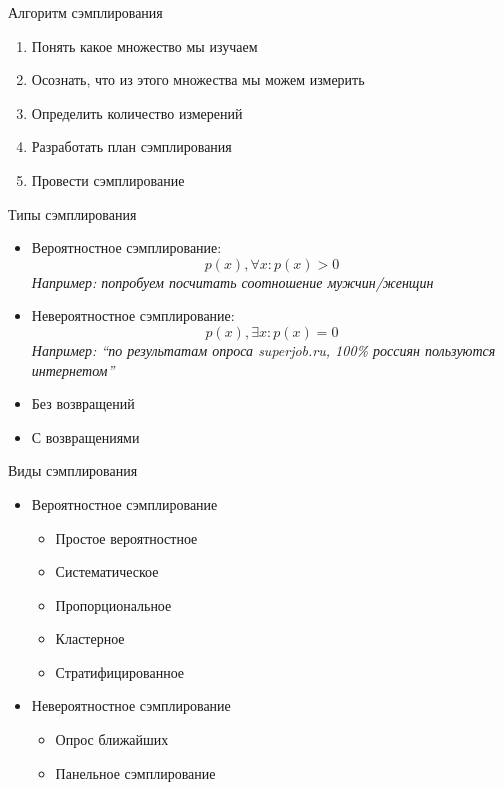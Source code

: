 \documentclass[14pt, fleqn, xcolor={dvipsnames, table}]{beamer}
\begin{document}
\begin{frame}{Алгоритм сэмплирования}
\begin{enumerate}
   \item Понять какое множество мы изучаем
   \item Осознать, что из этого множества мы можем измерить
   \item Определить количество измерений
   \item Разработать план сэмплирования
   \item Провести сэмплирование
\end{enumerate}
\end{frame}

\begin{frame}{Типы сэмплирования}
\begin{itemize}
   \item Вероятностное сэмплирование: 
   $$
   p(x),\forall x:p(x) > 0
   $$
   \textit{Например: попробуем посчитать соотношение мужчин/женщин}
   \item Невероятностное сэмплирование:
   $$
   p(x), \exists x: p(x) = 0
   $$
   \textit{Например: ``по результатам опроса superjob.ru, 100\% россиян пользуются интернетом''}
   \item Без возвращений
   \item С возвращениями
\end{itemize}
\end{frame}

\begin{frame}{Виды сэмплирования}
\begin{itemize}
   \item Вероятностное сэмплирование
   \begin{itemize}
    \item Простое вероятностное
    \item Систематическое
    \item Пропорциональное
    \item Кластерное
    \item Стратифицированное
   \end{itemize}
   \item Невероятностное сэмплирование
   \begin{itemize}
    \item Опрос ближайших
    \item Панельное сэмплирование
   \end{itemize}
\end{itemize}
\end{frame}
\end{document}
